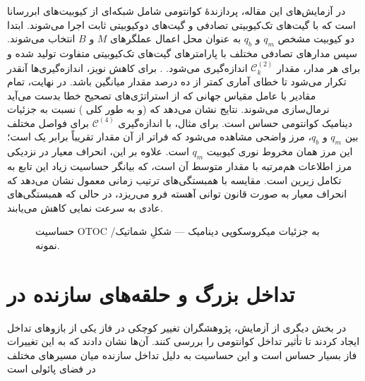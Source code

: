در آزمایش‌های این مقاله، پردازندهٔ کوانتومی شامل شبکه‌ای از کیوبیت‌های ابررسانا است که با گیت‌های تک‌کیوبیتی تصادفی و گیت‌های دوکیوبیتی ثابت اجرا می‌شوند. ابتدا دو کیوبیت مشخص \(q_m\) و \(q_b\) به عنوان محل اعمال عملگرهای \(M\) و \(B\) انتخاب می‌شوند. سپس مدارهای تصادفی مختلف با پارامترهای گیت‌های تک‌کیوبیتی متفاوت تولید شده و برای هر مدار، مقدار \(\mathcal{C}_k^{(2)}\) اندازه‌گیری می‌شود.
. برای کاهش نویز، اندازه‌گیری‌ها آنقدر تکرار می‌شود تا خطای آماری کمتر از ده درصد مقدار میانگین باشد.  در نهایت، تمام مقادیر با عامل مقیاس جهانی که از استراتژی‌های تصحیح خطا بدست می‌آید نرمال‌سازی می‌شوند.
نتایج نشان می‌دهد که  (و به طور کلی ) نسبت به جزئیات دینامیک کوانتومی حساس است. برای مثال، با اندازه‌گیری \(\mathcal{C}^{(4)}\) برای فواصل مختلف بین \(q_m\) و \(q_b\)، مرز واضحی مشاهده می‌شود که فراتر از آن مقدار  تقریباً برابر یک است؛ این مرز همان مخروط نوری کیوبیت \(q_m\) است. علاوه بر این، انحراف معیار  در نزدیکی مرز اطلاعات هم‌مرتبه با مقدار متوسط آن است، که بیانگر حساسیت زیاد این تابع به تکامل زیرین است. مقایسه با همبستگی‌های ترتیب زمانی معمول نشان می‌دهد که انحراف معیار  به صورت قانون توانی آهسته فرو می‌ریزد، در حالی که همبستگی‌های عادی به سرعت نمایی کاهش می‌یابند.

\begin{figure}[htbp]
  \centering
  \caption{حساسیت OTOC به جزئیات میکروسکوپی دینامیک — شکلِ شماتیک/نمونه.}
  \label{fig:otoc-sensitivity}
\end{figure}

\section{تداخل بزرگ و حلقه‌های سازنده در }

در بخش دیگری از آزمایش، پژوهشگران تغییر کوچکی در فاز یکی از بازوهای تداخل ایجاد کردند تا تأثیر تداخل کوانتومی را بررسی کنند. آن‌ها نشان دادند که  به این تغییرات فاز بسیار حساس است و این حساسیت به دلیل تداخل سازنده میان مسیرهای مختلف در فضای پائولی است



